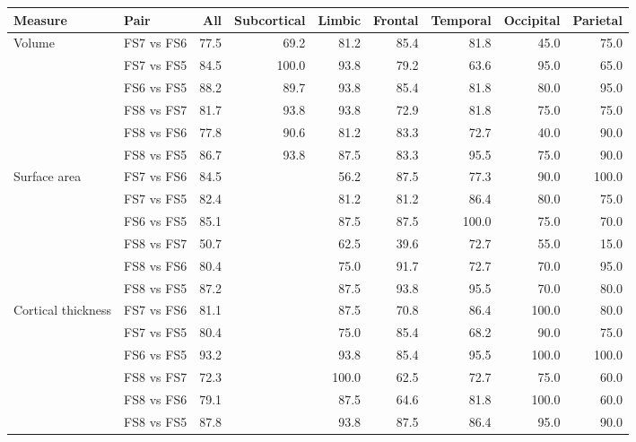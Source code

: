 \begin{tabular}{llrrrrrrr}
\toprule
Measure & Pair & All & Subcortical & Limbic & Frontal & Temporal & Occipital & Parietal \\
\midrule
Volume & FS7 vs FS6 & 77.5 & 69.2 & 81.2 & 85.4 & 81.8 & 45.0 & 75.0 \\
 & FS7 vs FS5 & 84.5 & 100.0 & 93.8 & 79.2 & 63.6 & 95.0 & 65.0 \\
 & FS6 vs FS5 & 88.2 & 89.7 & 93.8 & 85.4 & 81.8 & 80.0 & 95.0 \\
 & FS8 vs FS7 & 81.7 & 93.8 & 93.8 & 72.9 & 81.8 & 75.0 & 75.0 \\
 & FS8 vs FS6 & 77.8 & 90.6 & 81.2 & 83.3 & 72.7 & 40.0 & 90.0 \\
 & FS8 vs FS5 & 86.7 & 93.8 & 87.5 & 83.3 & 95.5 & 75.0 & 90.0 \\
\midrule
Surface area & FS7 vs FS6 & 84.5 &  & 56.2 & 87.5 & 77.3 & 90.0 & 100.0 \\
 & FS7 vs FS5 & 82.4 &  & 81.2 & 81.2 & 86.4 & 80.0 & 75.0 \\
 & FS6 vs FS5 & 85.1 &  & 87.5 & 87.5 & 100.0 & 75.0 & 70.0 \\
 & FS8 vs FS7 & 50.7 &  & 62.5 & 39.6 & 72.7 & 55.0 & 15.0 \\
 & FS8 vs FS6 & 80.4 &  & 75.0 & 91.7 & 72.7 & 70.0 & 95.0 \\
 & FS8 vs FS5 & 87.2 &  & 87.5 & 93.8 & 95.5 & 70.0 & 80.0 \\
\midrule
Cortical thickness & FS7 vs FS6 & 81.1 &  & 87.5 & 70.8 & 86.4 & 100.0 & 80.0 \\
 & FS7 vs FS5 & 80.4 &  & 75.0 & 85.4 & 68.2 & 90.0 & 75.0 \\
 & FS6 vs FS5 & 93.2 &  & 93.8 & 85.4 & 95.5 & 100.0 & 100.0 \\
 & FS8 vs FS7 & 72.3 &  & 100.0 & 62.5 & 72.7 & 75.0 & 60.0 \\
 & FS8 vs FS6 & 79.1 &  & 87.5 & 64.6 & 81.8 & 100.0 & 60.0 \\
 & FS8 vs FS5 & 87.8 &  & 93.8 & 87.5 & 86.4 & 95.0 & 90.0 \\
\bottomrule
\end{tabular}
